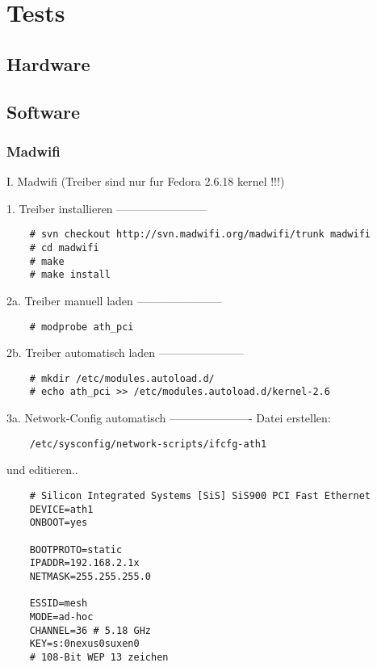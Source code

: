 \section{Tests}

\subsection{Hardware}

\subsection{Software}

\subsubsection{Madwifi}

I. Madwifi (Treiber sind nur fur Fedora 2.6.18 kernel !!!)

1. Treiber installieren
------------------------
\begin{verbatim}
	# svn checkout http://svn.madwifi.org/madwifi/trunk madwifi	
	# cd madwifi	
	# make	
	# make install
\end{verbatim}

2a. Treiber manuell laden 
-----------------------
\begin{verbatim}
	# modprobe ath_pci
\end{verbatim}

2b. Treiber automatisch laden
-----------------------
\begin{verbatim}
	# mkdir /etc/modules.autoload.d/
	# echo ath_pci >> /etc/modules.autoload.d/kernel-2.6
\end{verbatim}

3a. Network-Config automatisch
----------------------
Datei erstellen:
\begin{verbatim}
	/etc/sysconfig/network-scripts/ifcfg-ath1
\end{verbatim}

und editieren..

\begin{verbatim}
	# Silicon Integrated Systems [SiS] SiS900 PCI Fast Ethernet
	DEVICE=ath1
	ONBOOT=yes
	
	BOOTPROTO=static
	IPADDR=192.168.2.1x
	NETMASK=255.255.255.0
	
	ESSID=mesh
	MODE=ad-hoc
	CHANNEL=36 # 5.18 GHz
	KEY=s:0nexus0suxen0
	# 108-Bit WEP 13 zeichen
\end{verbatim}

